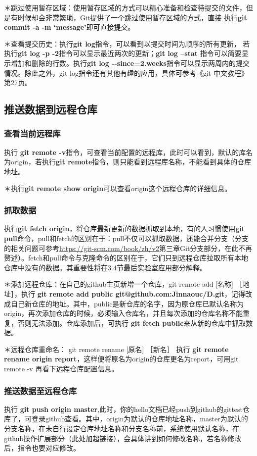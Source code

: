 \documentclass{article}
\begin{document}
＊跳过使用暂存区域：使用暂存区域的方式可以精心准备和检查待提交的文件，但是有时候却会非常繁琐，Git提供了一个跳过使用暂存区域的方式，直接 执行\textbf{git commit -a -m `message'}即可直接提交。 

＊查看提交历史：执行\textbf{git log}指令，可以看到以提交时间为顺序的所有更新， 若执行\textbf{git log -p -2}指令可以显示最近两次的更新；\textbf{git log --stat} 指令可以简要显示增加和删除的行数。执行\textbf{git log {-}{-}since=2.weeks}指令可以显示两周内的提交情况。除此之外，git log指令还有其他有趣的应用，具体可参考《git 中文教程》 第27页。

\subsection{推送数据到远程仓库}
\subsubsection{查看当前远程库}
执行 \textbf{git remote -v}指令，可查看当前配置的远程库，此时可以看到，默认的库名为origin，若执行\textbf{git remote}指令，则只能看到远程库名称，不能看到具体的仓库地址。

＊执行\textbf{git remote show origin}可以查看origin这个远程仓库的详细信息。

\subsubsection{抓取数据}
执行\textbf{git fetch origin}，将仓库最新更新的数据抓取到本地，有的人习惯使用\textbf{git pull}命令，pull和fetch的区别在于：pull不仅可以抓取数据，还能合并分支（分支的相关问题可参考\url{https://git-scm.com/book/zh/v2}第三章Git分支部分，在此不再赘述）。fetch和pull命令与克隆命令的区别在于，它们只到远程仓库拉取所有本地仓库中没有的数据。其重要性将在3.4节最后实验室应用部分解释。

＊添加远程仓库：在自己的github主页新增一个仓库，git remote add [名称] ［地址］，执行 \textbf{git remote add public git@github.com:Jinnaouc/D.git}，记得改成自己新仓库的地址。其中，public是新仓库的名字，因为原仓库已默认名称为origin，再次添加仓库的时候，必须输入仓库名，并且每次添加的仓库名称不能重复，否则无法添加。仓库添加后，可执行 \textbf{git fetch public}来从新的仓库中抓取数据。

＊远程仓库重命名： git remote rename [原名] ［新名］ 执行 \textbf{git remote rename origin report}，这样便将原名为origin的仓库更名为report，可用git remote -v 再看下远程仓库配置信息。
\subsubsection{推送数据至远程仓库}
执行 \textbf{git push origin master},此时，你的hello文档已经push到github的gittest仓库了，可登录github查看。其中，origin为默认的仓库地址名称，master为默认的分支名称，在未自行设定仓库地址名称和分支名称前，系统使用默认名称，在github操作扩展部分（此处加超链接），会具体讲到如何修改名称，若名称修改后，指令也要对应修改。
\end{document}
